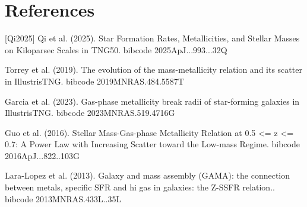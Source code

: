 \documentclass[twocolumn]{aastex631}
\begin{document}
\section*{References}
\footnotesize
[Qi2025] Qi et al. (2025). Star Formation Rates, Metallicities, and Stellar Masses on Kiloparsec Scales in TNG50. bibcode 2025ApJ...993...32Q \par [Torrey2019] Torrey et al. (2019). The evolution of the mass-metallicity relation and its scatter in IllustrisTNG. bibcode 2019MNRAS.484.5587T \par [Garcia2023] Garcia et al. (2023). Gas-phase metallicity break radii of star-forming galaxies in IllustrisTNG. bibcode 2023MNRAS.519.4716G \par [Guo2016] Guo et al. (2016). Stellar Mass-Gas-phase Metallicity Relation at 0.5 <= z <= 0.7: A Power Law with Increasing Scatter toward the Low-mass Regime. bibcode 2016ApJ...822..103G \par [LaraLopez2013] Lara-Lopez et al. (2013). Galaxy and mass assembly (GAMA): the connection between metals, specific  SFR and hi gas in galaxies: the Z-SSFR relation.. bibcode 2013MNRAS.433L..35L
\end{document}
